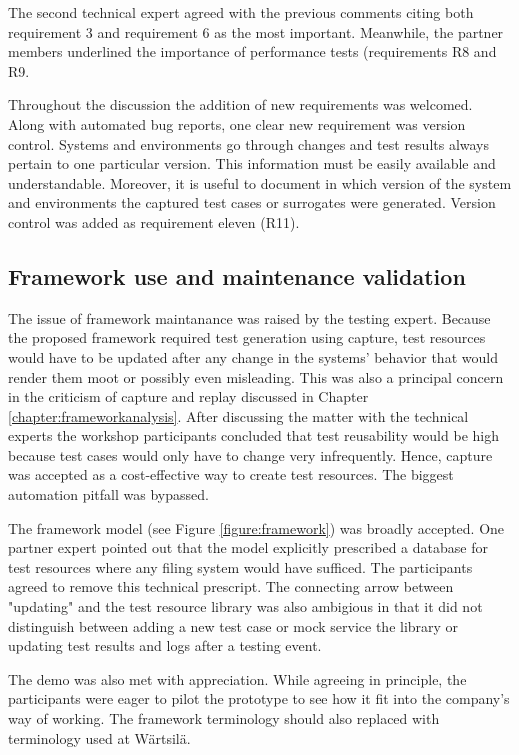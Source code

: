 \documentclass[12pt,a4paper,oneside,pdftex]{report}
\begin{document}
{%
The second technical expert agreed with the previous comments citing both requirement 3 and requirement 6 as the most important. Meanwhile, the partner members underlined the importance of performance tests (requirements R8 and R9.

Throughout the discussion the addition of new requirements was welcomed. Along with automated bug reports, one clear new requirement was version control. Systems and environments go through changes and test results always pertain to one particular version. This information must be easily available and understandable. Moreover, it is useful to document in which version of the system and environments the captured test cases or surrogates were generated. Version control was added as requirement eleven (R11).

\subsection{Framework use and maintenance validation}

The issue of framework maintanance was raised by the testing expert. Because the proposed framework required test generation using capture, test resources would have to be updated after any change in the systems' behavior that would render them moot or possibly even misleading. This was also a principal concern in the criticism of capture and replay discussed in Chapter \ref{chapter:frameworkanalysis}. After discussing the matter with the technical experts the workshop participants concluded that test reusability would be high because test cases would only have to change very infrequently. Hence, capture was accepted as a cost-effective way to create test resources. The biggest automation pitfall was bypassed.

The framework model (see Figure \ref{figure:framework}) was broadly accepted. One partner expert pointed out that the model explicitly prescribed a database for test resources where any filing system would have sufficed. The participants agreed to remove this technical prescript. The connecting arrow between "updating" and the test resource library was also ambigious in that it did not distinguish between adding a new test case or mock service the library or updating test results and logs after a testing event.

The demo was also met with appreciation. While agreeing in principle, the participants were eager to pilot the prototype to see how it fit into the company's way of working. The framework terminology should also replaced with terminology used at Wärtsilä.

}
\end{document}
